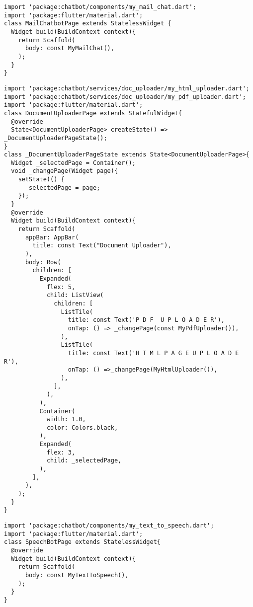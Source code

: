 \begin{lstlisting}[style=pythonstyle,caption={Codice del mail\_chatbot\_page.dart}, label={lst:mailchatbot}]
import 'package:chatbot/components/my_mail_chat.dart';
import 'package:flutter/material.dart';
class MailChatbotPage extends StatelessWidget {
  Widget build(BuildContext context){
    return Scaffold(
      body: const MyMailChat(),
    );
  }
}
\end{lstlisting}
\begin{lstlisting}[style=pythonstyle,caption={Codice del document\_uploader\_page.dart}, label={lst:documentuploader}]
import 'package:chatbot/services/doc_uploader/my_html_uploader.dart';
import 'package:chatbot/services/doc_uploader/my_pdf_uploader.dart';
import 'package:flutter/material.dart';
class DocumentUploaderPage extends StatefulWidget{
  @override
  State<DocumentUploaderPage> createState() => _DocumentUploaderPageState();
}
class _DocumentUploaderPageState extends State<DocumentUploaderPage>{
  Widget _selectedPage = Container();
  void _changePage(Widget page){
    setState(() {
      _selectedPage = page;
    });
  }
  @override
  Widget build(BuildContext context){
    return Scaffold(
      appBar: AppBar(
        title: const Text("Document Uploader"),
      ),
      body: Row(
        children: [
          Expanded(
            flex: 5,  
            child: ListView(
              children: [
                ListTile(
                  title: const Text('P D F  U P L O A D E R'),
                  onTap: () => _changePage(const MyPdfUploader()),
                ),
                ListTile(
                  title: const Text('H T M L P A G E U P L O A D E R'),
                  onTap: () =>_changePage(MyHtmlUploader()),
                ),
              ],
            ),
          ),
          Container(
            width: 1.0,
            color: Colors.black,
          ),
          Expanded(
            flex: 3,
            child: _selectedPage,
          ),
        ],
      ),
    );
  }
}
\end{lstlisting}
\begin{lstlisting}[style=pythonstyle,caption={Codice del speechbot\_page.dart}, label={lst:speechbot}]
import 'package:chatbot/components/my_text_to_speech.dart';
import 'package:flutter/material.dart';
class SpeechBotPage extends StatelessWidget{
  @override
  Widget build(BuildContext context){
    return Scaffold(
      body: const MyTextToSpeech(),
    );
  }
}
\end{lstlisting}
